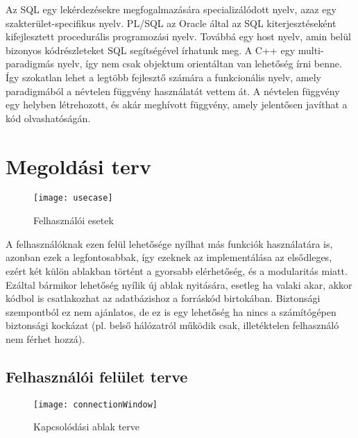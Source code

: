 Az SQL egy lekérdezésekre megfogalmazására specializálódott nyelv, azaz egy szakterület-specifikus nyelv.
PL/SQL az Oracle által az SQL kiterjesztéseként kifejlesztett procedurális programozási nyelv. Továbbá egy host nyelv,
amin belül bizonyos kódrészleteket SQL segítségével írhatunk meg. A C++ egy multi-paradigmás nyelv, így nem csak objektum orientáltan van lehetőség írni benne.
Így szokatlan lehet a legtöbb fejlesztő számára a funkcionális nyelv, amely paradigmából a névtelen függvény használatát vettem át. A névtelen függvény
egy helyben létrehozott, és akár meghívott függvény, amely jelentősen javíthat a kód olvashatóságán.

\section{Megoldási terv}

\begin{figure}[ht]
  \begin{center}
  \texttt{[image: usecase]}
  \end{center}
 \caption{Felhasználói esetek}
\end{figure}

A felhasználóknak ezen felül lehetősége nyílhat más funkciók használatára is,
azonban ezek a legfontosabbak, így ezeknek az implementálása az elsődleges, ezért két külön ablakban történt a gyorsabb elérhetőség, és
a modularitás miatt. Ezáltal bármikor lehetőség nyílik új ablak nyitására, esetleg
ha valaki akar, akkor kódbol is csatlakozhat az adatbázishoz a forráskód birtokában.
Biztonsági szempontból ez nem ajánlatos, de ez is egy lehetőség ha nincs a számítógépen
biztonsági kockázat (pl. belső hálózatról működik csak, illetéktelen felhasználó nem férhet hozzá).

\subsection{Felhasználói felület terve}
\begin{figure}[ht]
  \begin{center}
  \texttt{[image: connectionWindow]}
  \end{center}
 \caption{Kapcsolódási ablak terve}
\end{figure}

